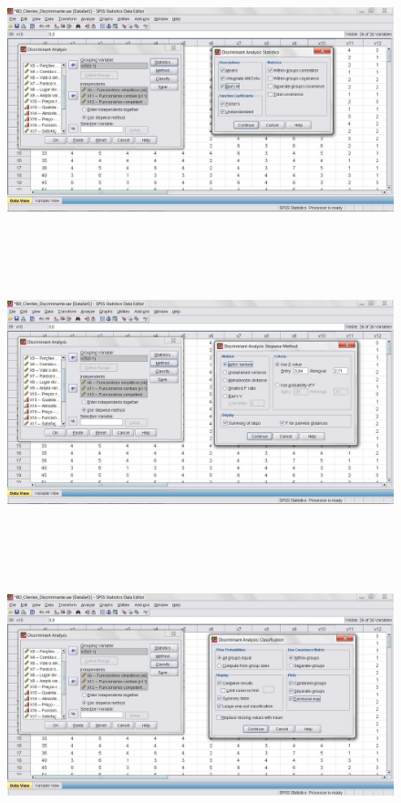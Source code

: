 			\begin{figure}[H]
				\centering
				\includegraphics[height=8cm]{images/analise-discriminante_passo-a-passo_4}
			\end{figure}

			\begin{figure}[H]
				\centering
				\includegraphics[height=8cm]{images/analise-discriminante_passo-a-passo_5}
			\end{figure}

			\begin{figure}[H]
				\centering
				\includegraphics[height=8cm]{images/analise-discriminante_passo-a-passo_6}
			\end{figure}

